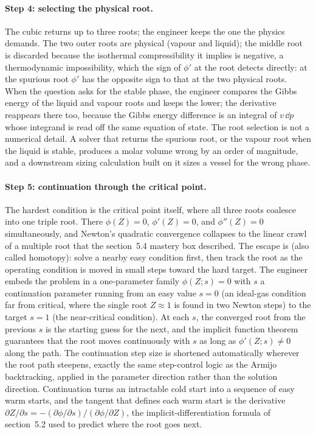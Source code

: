 \paragraph{Step 4: selecting the physical root.}
The cubic returns up to three roots; the engineer keeps the one the
physics demands. The two outer roots are physical (vapour and liquid);
the middle root is discarded because the isothermal compressibility it
implies is negative, a thermodynamic impossibility, which the sign of
$\phi'$ at the root detects directly: at the spurious root $\phi'$ has
the opposite sign to that at the two physical roots. When the question
asks for the stable phase, the engineer compares the Gibbs energy of the
liquid and vapour roots and keeps the lower; the derivative reappears
there too, because the Gibbs energy difference is an integral of $v\,
\dd p$ whose integrand is read off the same equation of state. The root
selection is not a numerical detail. A solver that returns the spurious
root, or the vapour root when the liquid is stable, produces a molar
volume wrong by an order of magnitude, and a downstream sizing
calculation built on it sizes a vessel for the wrong phase.

\paragraph{Step 5: continuation through the critical point.}
The hardest condition is the critical point itself, where all three
roots coalesce into one triple root. There $\phi(Z) = 0$,
$\phi'(Z) = 0$, and $\phi''(Z) = 0$ simultaneously, and Newton's
quadratic convergence collapses to the linear crawl of a multiple root
that the section~5.4 mastery box described. The escape is
 (also called homotopy): solve a nearby easy
condition first, then track the root as the operating condition is moved
in small steps toward the hard target. The engineer embeds the problem
in a one-parameter family $\phi(Z; s) = 0$ with $s$ a continuation
parameter running from an easy value $s = 0$ (an ideal-gas condition far
from critical, where the single root $Z \approx 1$ is found in two
Newton steps) to the target $s = 1$ (the near-critical condition). At
each $s$, the converged root from the previous $s$ is the starting guess
for the next, and the implicit function theorem guarantees that the root
moves continuously with $s$ as long as $\phi'(Z; s) \neq 0$ along the
path. The continuation step size is shortened automatically wherever the
root path steepens, exactly the same step-control logic as the Armijo
backtracking, applied in the parameter direction rather than the
solution direction. Continuation turns an intractable cold start into a
sequence of easy warm starts, and the tangent that defines each warm
start is the derivative $\partial Z/\partial s = -(\partial \phi/
\partial s)/(\partial \phi/\partial Z)$, the implicit-differentiation
formula of section~5.2 used to predict where the root goes next.

